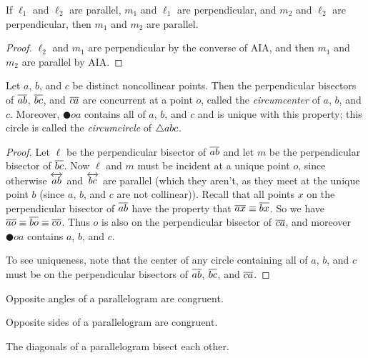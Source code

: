 \begin{prop}
If \(\ell_1\) and \(\ell_2\) are parallel, \(m_1\) and \(\ell_1\) are perpendicular, and \(m_2\) and \(\ell_2\) are perpendicular, then \(m_1\) and \(m_2\) are parallel.
\end{prop}

\begin{proof}
\(\ell_2\) and \(m_1\) are perpendicular by the converse of AIA, and then \(m_1\) and \(m_2\) are parallel by AIA.
\end{proof}

\begin{construct}
Let \(a\), \(b\), and \(c\) be distinct noncollinear points.
Then the perpendicular bisectors of \(\overline{ab}\), \(\overline{bc}\), and \(\overline{ca}\) are concurrent at a point \(o\), called the \emph{circumcenter} of \(a\), \(b\), and \(c\).
Moreover, \(\CIRCLE{o}{a}\) contains all of \(a\), \(b\), and \(c\) and is unique with this property; this circle is called the \emph{circumcircle} of \(\bigtriangleup{abc}\).
\end{construct}

\begin{proof}
Let \(\ell\) be the perpendicular bisector of \(\overline{ab}\) and let \(m\) be the perpendicular bisector of \(\overline{bc}\).
Now \(\ell\) and \(m\) must be incident at a unique point \(o\), since otherwise \(\overleftrightarrow{ab}\) and \(\overleftrightarrow{bc}\) are parallel (which they aren't, as they meet at the unique point \(b\) (since \(a\), \(b\), and \(c\) are not collinear)).
Recall that all points \(x\) on the perpendicular bisector of \(\overline{ab}\) have the property that \(\overline{ax} \equiv \overline{bx}\).
So we have \(\overline{ao} \equiv \overline{bo} \equiv \overline{co}\).
Thus \(o\) is also on the perpendicular bisector of \(\overline{ca}\), and moreover \(\CIRCLE{o}{a}\) contains \(a\), \(b\), and \(c\).

To see uniqueness, note that the center of any circle containing all of \(a\), \(b\), and \(c\) must be on the perpendicular bisectors of \(\overline{ab}\), \(\overline{bc}\), and \(\overline{ca}\).
\end{proof}

\begin{prop} \mbox{}
\begin{proplist}
\item Opposite angles of a parallelogram are congruent.
\item Opposite sides of a parallelogram are congruent.
\item The diagonals of a parallelogram bisect each other.
\end{proplist}
\end{prop}

